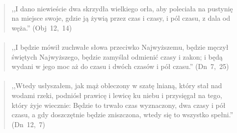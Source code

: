 \documentclass[10pt,a4paper,oneside]{article}
\begin{document}
\paragraph{}
\begin{quote}
,,I dano niewieście dwa skrzydła wielkiego orła, aby poleciała na pustynię na miejsce swoje, gdzie ją żywią przez czas i czasy, i pól czasu, z dala od węża.'' \mbox{(Obj 12, 14)}
\end{quote}
\paragraph{}
\begin{quote}
,,I będzie mówił zuchwałe słowa przeciwko Najwyższemu, będzie męczył świętych Najwyższego, będzie zamyślał odmienić czasy i zakon; i będą wydani w jego moc aż do czasu i dwóch czasów i pół czasu.'' \mbox{(Dn 7, 25)}
\end{quote}
\paragraph{}
\begin{quote}
,,Wtedy usłyszałem, jak mąż obleczony w szatę lnianą, który stał nad wodami rzeki, podniósł prawicę i lewicę ku niebu i przysięgał na tego, który żyje wiecznie: Będzie to trwało czas wyznaczony, dwa czasy i pół czasu, a gdy doszczętnie będzie zniszczona, wtedy się to wszystko spełni.'' \mbox{(Dn 12, 7)}
\end{quote}
\end{document}
